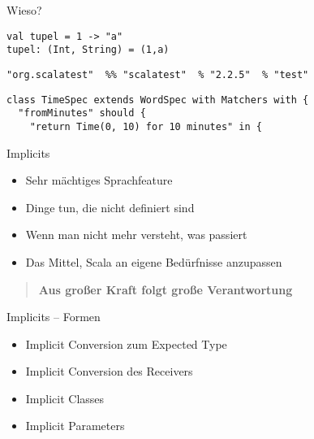 \documentclass[14pt,aspectratio=169,trans]{beamer} %
\begin{document}
\begin{frame}[fragile]{}
	\begin{block}{Wieso?}
		\scriptsize
		\onslide<2->
  \begin{lstlisting}
val tupel = 1 -> "a"
tupel: (Int, String) = (1,a)
	\end{lstlisting}
\begin{lstlisting}[firstnumber=3]
"org.scalatest"  %% "scalatest"  % "2.2.5"  % "test"
\end{lstlisting}
\begin{lstlisting}[firstnumber=4]
class TimeSpec extends WordSpec with Matchers with {
  "fromMinutes" should {
    "return Time(0, 10) for 10 minutes" in {
\end{lstlisting}
	\end{block}
\end{frame}

\begin{frame}{}
	\begin{block}{Implicits}
		\begin{itemize}
			\item<2->Sehr mächtiges Sprachfeature
			\item<3->Dinge tun, die nicht definiert sind
			\item<4->Wenn man nicht mehr versteht, was passiert
			\item<5->Das Mittel, Scala an eigene Bedürfnisse anzupassen
		\end{itemize}
	\end{block}
	\note{}
\end{frame}

\begin{frame}{}
  \begin{quote}
		{\large\textbf{Aus großer Kraft folgt große Verantwortung}}
		\vskip3mm
		\hspace*{}
	\end{quote}
	\note{
}
\end{frame}

\begin{frame}{}
	\begin{block}{Implicits -- Formen}
		\begin{itemize}
			\item<2->Implicit Conversion zum Expected Type
			\item<3->Implicit Conversion des Receivers
			\item<4->Implicit Classes
			\item<5->Implicit Parameters
		\end{itemize}
	\end{block}
	\note{}
\end{frame}
\end{document}
